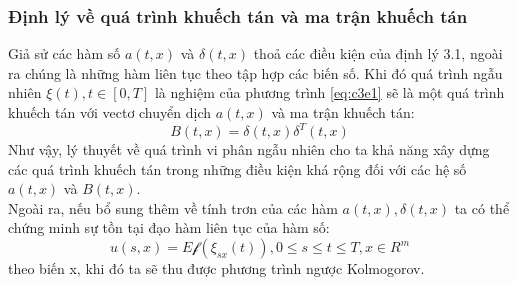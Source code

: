 \documentclass[14pt,a4paper]{article}
\numberwithin{equation}{section}
\begin{document}
\subsubsection{Định lý về quá trình khuếch tán và ma trận khuếch tán}
Giả sử các hàm số $a(t,x)$ và $\delta(t,x)$ thoả các điều kiện của định lý 3.1, ngoài ra chúng là những hàm liên tục theo tập hợp các biến số. Khi đó quá trình ngẫu nhiên $\xi(t),t\in[0,T]$ là nghiệm của phương trình \eqref{eq:c3e1} sẽ là một quá trình khuếch tán với vectơ chuyển dịch $a(t,x)$ và ma trận khuếch tán:
\begin{equation*}
	B(t,x)=\delta(t,x)\delta^T(t,x)
\end{equation*}
Như vậy, lý thuyết về quá trình vi phân ngẫu nhiên cho ta khả năng xây dựng các quá trình khuếch tán trong những điều kiện khá rộng đối với các hệ số $a(t,x)$ và $B(t,x)$.\\
Ngoài ra, nếu bổ sung thêm về tính trơn của các hàm $a(t,x),\delta(t,x)$ ta có thể chứng minh sự tồn tại đạo hàm liên tục của hàm số:
\begin{equation*}
	u(s,x)=E\mathscr{f}(\xi_{sx}(t)),0\leq s\leq t\leq T,x\in R^m
\end{equation*}
theo biến x, khi đó ta sẽ thu được phương trình ngược Kolmogorov.\\
\end{document}
